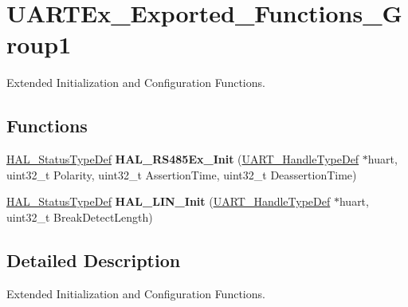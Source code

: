 \hypertarget{group___u_a_r_t_ex___exported___functions___group1}{}\section{U\+A\+R\+T\+Ex\+\_\+\+Exported\+\_\+\+Functions\+\_\+\+Group1}
\label{group___u_a_r_t_ex___exported___functions___group1}


Extended Initialization and Configuration Functions.  


\subsection*{Functions}
\begin{DoxyCompactItemize}
\item 
\mbox{\label{group___u_a_r_t_ex___exported___functions___group1_ga27862dc24258939a758a877b674977af}} 
\hyperlink{stm32f0xx__hal__def_8h_a63c0679d1cb8b8c684fbb0632743478f}{H\+A\+L\+\_\+\+Status\+Type\+Def} {\bfseries H\+A\+L\+\_\+\+R\+S485\+Ex\+\_\+\+Init} (\hyperlink{struct_u_a_r_t___handle_type_def}{U\+A\+R\+T\+\_\+\+Handle\+Type\+Def} $\ast$huart, uint32\+\_\+t Polarity, uint32\+\_\+t Assertion\+Time, uint32\+\_\+t Deassertion\+Time)
\item 
\mbox{\label{group___u_a_r_t_ex___exported___functions___group1_ga27e4497270bd06434e3965e4b06f5516}} 
\hyperlink{stm32f0xx__hal__def_8h_a63c0679d1cb8b8c684fbb0632743478f}{H\+A\+L\+\_\+\+Status\+Type\+Def} {\bfseries H\+A\+L\+\_\+\+L\+I\+N\+\_\+\+Init} (\hyperlink{struct_u_a_r_t___handle_type_def}{U\+A\+R\+T\+\_\+\+Handle\+Type\+Def} $\ast$huart, uint32\+\_\+t Break\+Detect\+Length)
\end{DoxyCompactItemize}


\subsection{Detailed Description}
Extended Initialization and Configuration Functions. 

